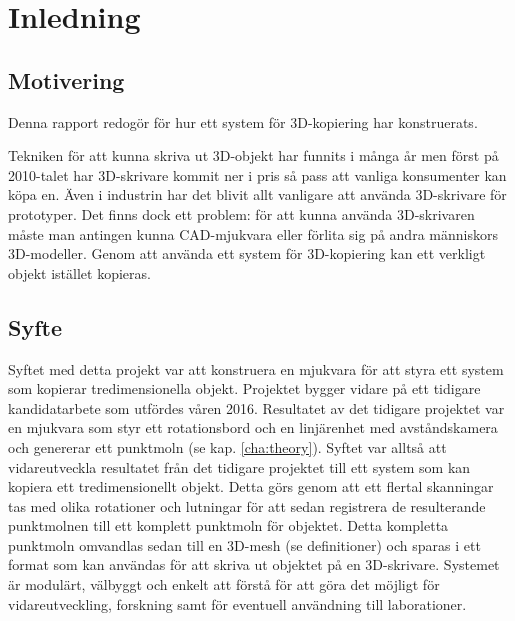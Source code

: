 \chapter{Inledning}
\label{cha:introduction}

\section{Motivering}
\label{sec:motivation}

Denna rapport redogör för hur ett system för 3D-kopiering har konstruerats. 

Tekniken för att kunna skriva ut 3D-objekt har funnits i många år men först på 2010-talet har 3D-skrivare kommit ner i pris så pass att vanliga konsumenter kan köpa en. Även i industrin har det blivit allt vanligare att använda 3D-skrivare för prototyper. Det finns dock ett problem: för att kunna använda 3D-skrivaren måste man antingen kunna CAD-mjukvara eller förlita sig på andra människors 3D-modeller. Genom att använda ett system för 3D-kopiering kan ett verkligt objekt istället kopieras.


\section{Syfte}
\label{sec:aim}

Syftet med detta projekt var att konstruera en mjukvara för att styra ett system som kopierar tredimensionella objekt. Projektet bygger vidare på ett tidigare kandidatarbete som utfördes våren 2016. Resultatet av det tidigare projektet var en mjukvara som styr ett rotationsbord och en linjärenhet med avståndskamera och genererar ett punktmoln (se kap. \ref{cha:theory}). Syftet var alltså att vidareutveckla resultatet från det tidigare projektet till ett system som kan kopiera ett tredimensionellt objekt. Detta görs genom att ett flertal skanningar tas med olika rotationer och lutningar för att sedan registrera de resulterande punktmolnen till ett komplett punktmoln för objektet. Detta kompletta punktmoln omvandlas sedan till en 3D-mesh (se definitioner) och sparas i ett format som kan användas för att skriva ut objektet på en 3D-skrivare. Systemet är modulärt, välbyggt och enkelt att förstå för att göra det möjligt för vidareutveckling, forskning samt för eventuell användning till laborationer.   


